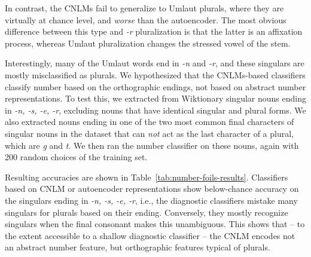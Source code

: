 In contrast, the CNLMs fail to generalize to Umlaut plurals, where
they are virtually at chance level, and \emph{worse} than the
autoencoder. The most obvious difference between this type and
\emph{-r} pluralization is that the latter is an affixation process,
whereas Umlaut pluralization changes the stressed vowel of the
stem.


%
Interestingly, many of the Umlaut words end in \emph{-n} and \emph{-r}, and these singulars are mostly misclassified as plurals. 
We hypothesized that the CNLMs-based classifiers classify number based on the orthographic endings, not based on abstract number representations.
To test this, we extracted from Wiktionary singular nouns ending in \emph{-n, -s, -e, -r}, excluding nouns that have identical singular and plural forms.
We also extracted nouns ending in one of the two most common final characters of singular nouns in the dataset that can \emph{not} act as the last character of a plural, which are \emph{g} and \emph{t}.
We then ran the number classifier on these nouns, again with 200 random choices of the training set.

Resulting accuracies are shown in Table~\ref{tab:number-foils-results}.
Classifiers based on CNLM or autoencoder representations show below-chance accuracy on the singulars ending in \emph{-n, -s, -e, -r}, i.e., the diagnostic classifiers mistake many singulars for plurals based on their ending.
Conversely, they mostly recognize singulars when the final consonant makes this unambiguous.
This shows that -- to the extent accessible to a shallow diagnostic classifier -- the CNLM encodes not an abstract number feature, but orthographic features typical of plurals.


